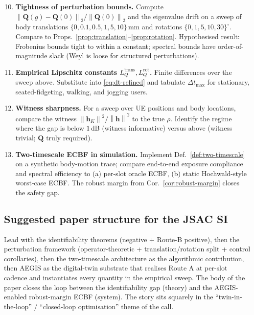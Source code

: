 \documentclass[11pt,a4paper]{article}
\theoremstyle{definition}
\newcommand{\hh}{\mathbf{h}}
\newcommand{\Q}{\mathbf{Q}}
\newcommand{\norm}[1]{\left\lVert #1 \right\rVert}
\begin{document}
\begin{enumerate}[leftmargin=2em,itemsep=2pt]
\setcounter{enumi}{9}
\item \textbf{Tightness of perturbation bounds.}
      Compute $\norm{\Q(g)-\Q(0)}_2/\norm{\Q(0)}_2$ and the
      eigenvalue drift on a sweep of body translations
      $\{0,0.1,0.5,1,5,10\}$\,mm and rotations
      $\{0,1,5,10,30\}^\circ$. Compare to
      Props.~\ref{prop:translation}--\ref{prop:rotation}. Hypothesised
      result: Frobenius bounds tight to within a constant; spectral
      bounds have order-of-magnitude slack (Weyl is loose for
      structured perturbations).
\item \textbf{Empirical Lipschitz constants $L_Q^{\mathrm{trans}},L_Q^{\mathrm{rot}}$.}
      Finite differences over the sweep above. Substitute into
      \eqref{eq:dt-refined} and tabulate $\Delta t_{\max}$ for stationary,
      seated-fidgeting, walking, and jogging users.
\item \textbf{Witness sharpness.}
      For a sweep over UE positions and body locations, compare the
      witness $\norm{\hh_K}^2/\norm{\hh}^2$ to the true $\rho$. Identify
      the regime where the gap is below $1$\,dB (witness informative)
      versus above (witness trivial; $\Q$ truly required).
\item \textbf{Two-timescale ECBF in simulation.}
      Implement Def.~\ref{def:two-timescale} on a synthetic body-motion
      trace; compare end-to-end exposure compliance and spectral
      efficiency to (a) per-slot oracle ECBF, (b) static
      Hochwald-style worst-case ECBF. The robust margin from
      Cor.~\ref{cor:robust-margin} closes the safety gap.
\end{enumerate}

\subsection{Suggested paper structure for the JSAC SI}

Lead with the identifiability theorems (negative + Route-B positive),
then the perturbation framework (operator-theoretic + translation/rotation
split + control corollaries), then the two-timescale architecture as
the algorithmic contribution, then AEGIS as the digital-twin substrate
that realises Route A at per-slot cadence and instantiates every
quantity in the empirical sweep. The body of the paper closes the loop
between the identifiability gap (theory) and the AEGIS-enabled
robust-margin ECBF (system). The story sits squarely in the
``twin-in-the-loop'' / ``closed-loop optimisation'' theme of the call.
\end{document}
